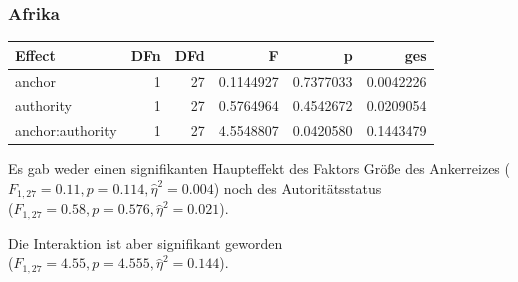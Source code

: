 \documentclass[
]{book}
\begin{document}
\hypertarget{afrika}{%
\subsubsection{Afrika}\label{afrika}}

\begin{tabular}[t]{lrrrrr}
\toprule
Effect & DFn & DFd & F & p & ges\\
\midrule
anchor & 1 & 27 & 0.1144927 & 0.7377033 & 0.0042226\\
authority & 1 & 27 & 0.5764964 & 0.4542672 & 0.0209054\\
anchor:authority & 1 & 27 & 4.5548807 & 0.0420580 & 0.1443479\\
\bottomrule
\end{tabular}

Es gab weder einen signifikanten Haupteffekt des Faktors Größe des Ankerreizes (\(F_{1,27}=0.11, p = 0.114, \hat{\eta}^2 =0.004\))
noch des Autoritätsstatus\\
(\(F_{1,27}=0.58, p = 0.576, \hat{\eta}^2 =0.021\)).

Die Interaktion ist aber signifikant geworden\\
(\(F_{1,27}=4.55, p = 4.555, \hat{\eta}^2 =0.144\)).
\end{document}
